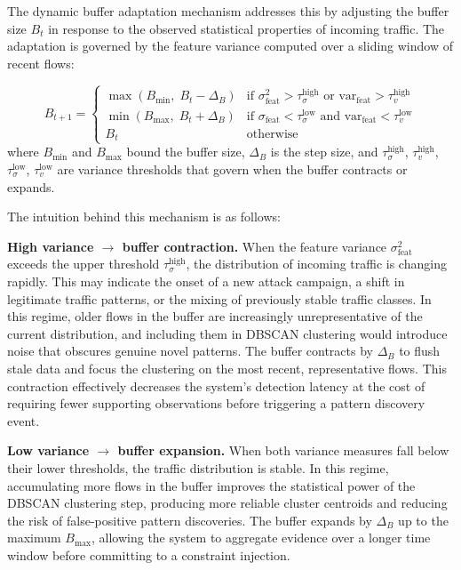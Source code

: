 \documentclass[12pt, letterpaper, oneside]{report}
\begin{document}
The dynamic buffer adaptation mechanism addresses this by adjusting the buffer size $B_t$ in response to the observed statistical properties of incoming traffic. The adaptation is governed by the feature variance computed over a sliding window of recent flows:

\begin{equation}
\label{eq:buffer_adapt}
B_{t+1} = \begin{cases}
\max(B_{\min}, \; B_t - \Delta_B) & \text{if } \sigma^2_{\text{feat}} > \tau_{\sigma}^{\text{high}} \text{ or } \text{var}_{\text{feat}} > \tau_v^{\text{high}} \\
\min(B_{\max}, \; B_t + \Delta_B) & \text{if } \sigma_{\text{feat}} < \tau_{\sigma}^{\text{low}} \text{ and } \text{var}_{\text{feat}} < \tau_v^{\text{low}} \\
B_t & \text{otherwise}
\end{cases}
\end{equation}
where $B_{\min}$ and $B_{\max}$ bound the buffer size, $\Delta_B$ is the step size, and $\tau_{\sigma}^{\text{high}}$, $\tau_v^{\text{high}}$, $\tau_{\sigma}^{\text{low}}$, $\tau_v^{\text{low}}$ are variance thresholds that govern when the buffer contracts or expands.

The intuition behind this mechanism is as follows:

\textbf{High variance $\rightarrow$ buffer contraction.} When the feature variance $\sigma^2_{\text{feat}}$ exceeds the upper threshold $\tau_{\sigma}^{\text{high}}$, the distribution of incoming traffic is changing rapidly. This may indicate the onset of a new attack campaign, a shift in legitimate traffic patterns, or the mixing of previously stable traffic classes. In this regime, older flows in the buffer are increasingly unrepresentative of the current distribution, and including them in DBSCAN clustering would introduce noise that obscures genuine novel patterns. The buffer contracts by $\Delta_B$ to flush stale data and focus the clustering on the most recent, representative flows. This contraction effectively decreases the system's detection latency at the cost of requiring fewer supporting observations before triggering a pattern discovery event.

\textbf{Low variance $\rightarrow$ buffer expansion.} When both variance measures fall below their lower thresholds, the traffic distribution is stable. In this regime, accumulating more flows in the buffer improves the statistical power of the DBSCAN clustering step, producing more reliable cluster centroids and reducing the risk of false-positive pattern discoveries. The buffer expands by $\Delta_B$ up to the maximum $B_{\max}$, allowing the system to aggregate evidence over a longer time window before committing to a constraint injection.
\end{document}
